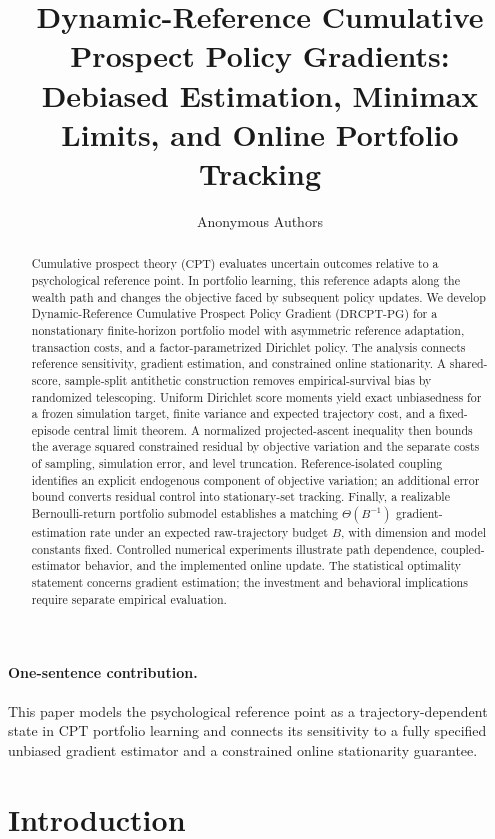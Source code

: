 \documentclass[11pt]{article}
\title{Dynamic-Reference Cumulative Prospect Policy Gradients:\\Debiased Estimation, Minimax Limits, and Online Portfolio Tracking}
\author{Anonymous Authors}
\date{}
\newcommand{\1}{\mathbf 1}
\newcommand{\CPT}{\ensuremath{\mathrm{CPT}}\xspace}
\newcommand{\DRCPTPG}{\ensuremath{\mathrm{DRCPT\mbox{-}PG}}\xspace}
\begin{document}
\maketitle

\begin{abstract}
Cumulative prospect theory (\CPT) evaluates uncertain outcomes relative to a psychological reference point. In portfolio learning, this reference adapts along the wealth path and changes the objective faced by subsequent policy updates. We develop Dynamic-Reference Cumulative Prospect Policy Gradient (\DRCPTPG) for a nonstationary finite-horizon portfolio model with asymmetric reference adaptation, transaction costs, and a factor-parametrized Dirichlet policy. The analysis connects reference sensitivity, gradient estimation, and constrained online stationarity. A shared-score, sample-split antithetic construction removes empirical-survival bias by randomized telescoping. Uniform Dirichlet score moments yield exact unbiasedness for a frozen simulation target, finite variance and expected trajectory cost, and a fixed-episode central limit theorem. A normalized projected-ascent inequality then bounds the average squared constrained residual by objective variation and the separate costs of sampling, simulation error, and level truncation. Reference-isolated coupling identifies an explicit endogenous component of objective variation; an additional error bound converts residual control into stationary-set tracking. Finally, a realizable Bernoulli-return portfolio submodel establishes a matching $\Theta(B^{-1})$ gradient-estimation rate under an expected raw-trajectory budget $B$, with dimension and model constants fixed. Controlled numerical experiments illustrate path dependence, coupled-estimator behavior, and the implemented online update. The statistical optimality statement concerns gradient estimation; the investment and behavioral implications require separate empirical evaluation.
\end{abstract}

\paragraph{One-sentence contribution.}
This paper models the psychological reference point as a trajectory-dependent state in \CPT portfolio learning and connects its sensitivity to a fully specified unbiased gradient estimator and a constrained online stationarity guarantee.


\section{Introduction}\label{sec:introduction}
\end{document}
